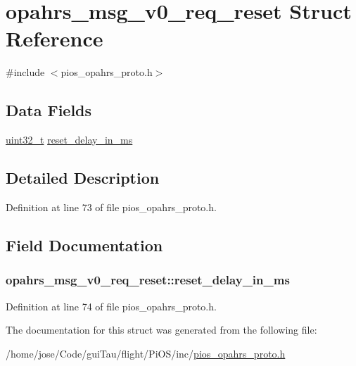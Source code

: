 \hypertarget{structopahrs__msg__v0__req__reset}{\section{opahrs\-\_\-msg\-\_\-v0\-\_\-req\-\_\-reset Struct Reference}
\label{structopahrs__msg__v0__req__reset}
}


{\ttfamily \#include $<$pios\-\_\-opahrs\-\_\-proto.\-h$>$}

\subsection*{Data Fields}
\begin{DoxyCompactItemize}
\item 
\hyperlink{stdint_8h_a435d1572bf3f880d55459d9805097f62}{uint32\-\_\-t} \hyperlink{structopahrs__msg__v0__req__reset_a9c64342ddda5a93973d1748d59c27254}{reset\-\_\-delay\-\_\-in\-\_\-ms}
\end{DoxyCompactItemize}


\subsection{Detailed Description}


Definition at line 73 of file pios\-\_\-opahrs\-\_\-proto.\-h.



\subsection{Field Documentation}
\hypertarget{structopahrs__msg__v0__req__reset_a9c64342ddda5a93973d1748d59c27254}{
\subsubsection[{reset\-\_\-delay\-\_\-in\-\_\-ms}]{ opahrs\-\_\-msg\-\_\-v0\-\_\-req\-\_\-reset\-::reset\-\_\-delay\-\_\-in\-\_\-ms}}\label{structopahrs__msg__v0__req__reset_a9c64342ddda5a93973d1748d59c27254}


Definition at line 74 of file pios\-\_\-opahrs\-\_\-proto.\-h.



The documentation for this struct was generated from the following file\-:\begin{DoxyCompactItemize}
\item 
/home/jose/\-Code/gui\-Tau/flight/\-Pi\-O\-S/inc/\hyperlink{pios__opahrs__proto_8h}{pios\-\_\-opahrs\-\_\-proto.\-h}\end{DoxyCompactItemize}
